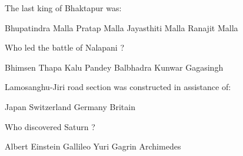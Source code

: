 \begin{questions}
\question The last king of Bhaktapur was:
  \begin{choices}
  \choice Bhupatindra Malla
  \choice Pratap Malla
  \choice Jayasthiti Malla
  \choice Ranajit Malla
  \end{choices}

\question Who led the battle of Nalapani ?
  \begin{choices}
  \choice Bhimsen Thapa
  \choice Kalu Pandey
  \choice Balbhadra Kunwar
  \choice Gagasingh
  \end{choices}

\question Lamosanghu-Jiri road section was constructed in assistance of:
  \begin{choices}
  \choice Japan
  \choice Switzerland
  \choice Germany
  \choice Britain
  \end{choices}

\question Who discovered Saturn ?
  \begin{choices}
  \choice Albert Einstein
  \choice Gallileo
  \choice Yuri Gagrin
  \choice Archimedes
  \end{choices}

\question
  \begin{choices}
  \choice
  \choice
  \choice
  \choice
  \end{choices}

\question
  \begin{choices}
  \choice
  \choice
  \choice
  \choice
  \end{choices}

\question
  \begin{choices}
  \choice
  \choice
  \choice
  \choice
  \end{choices}

\question
  \begin{choices}
  \choice
  \choice
  \choice
  \choice
  \end{choices}

\question
  \begin{choices}
  \choice
  \choice
  \choice
  \choice
  \end{choices}

\question
  \begin{choices}
  \choice
  \choice
  \choice
  \choice
  \end{choices}

\question
  \begin{choices}
  \choice
  \choice
  \choice
  \choice
  \end{choices}


\end{questions}
